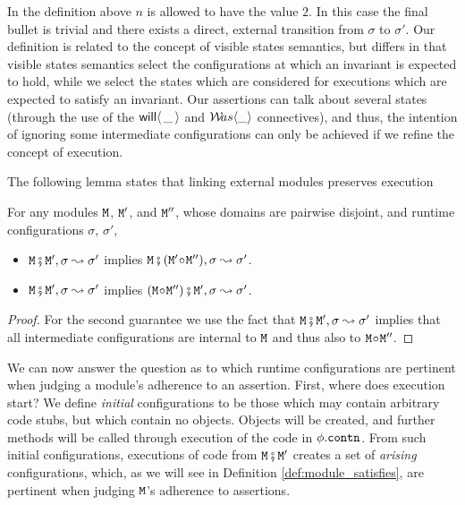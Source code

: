 In the definition above $n$ is allowed to have the value $2$. In this case the final bullet is trivial and  there exists a direct, external transition from $\sigma$ to $\sigma'$.  Our definition is related to the concept of visible states semantics, but differs in that visible states semantics select the configurations at which an invariant is expected to hold, while we select the states which are considered for executions which are expected to satisfy an invariant. Our assertions can talk about several states (through the use of the ${\mathsf{will}}\langle \,\_\,\rangle$ and ${{\mathcal W}\!as}\langle\_\rangle$ connectives), and thus, the intention of ignoring some intermediate configurations can only be achieved if we refine the concept of execution. 

The following lemma states that linking external modules preserves execution

\begin{lemma}
\label{lemma:module_pair_execution}
For any modules ${\mbox{\tt{\ensuremath{{\mbox{\tt{M}}}}}}}$, ${\mbox{\tt{\ensuremath{{\mbox{\tt{M}}}}}}}'$, and ${\mbox{\tt{\ensuremath{{\mbox{\tt{M}}}}}}}''$, whose domains are pairwise disjoint, and runtime configurations $\sigma$, $\sigma'$,

\begin{itemize}
\item
 ${\mbox{\tt{\ensuremath{{\mbox{\tt{M}}}}}}} \fatsemi {\mbox{\tt{\ensuremath{{\mbox{\tt{M}}}}}}}', \sigma \leadsto \sigma'$  implies ${\mbox{\tt{\ensuremath{{\mbox{\tt{M}}}}}}} \fatsemi ({\mbox{\tt{\ensuremath{{\mbox{\tt{M}}}}}}}'\!\circ\!{\mbox{\tt{\ensuremath{{\mbox{\tt{M}}}}}}}'') ,\sigma \leadsto \sigma'$.  
\item
  ${\mbox{\tt{\ensuremath{{\mbox{\tt{M}}}}}}} \fatsemi {\mbox{\tt{\ensuremath{{\mbox{\tt{M}}}}}}}', \sigma \leadsto \sigma'$  implies
$({\mbox{\tt{\ensuremath{{\mbox{\tt{M}}}}}}}\!\circ\!{\mbox{\tt{\ensuremath{{\mbox{\tt{M}}}}}}}'') \fatsemi {\mbox{\tt{\ensuremath{{\mbox{\tt{M}}}}}}}' , \sigma \leadsto \sigma'$.

\end{itemize}
\end{lemma}

\begin{proof} For the second guarantee  we use the fact that   ${\mbox{\tt{\ensuremath{{\mbox{\tt{M}}}}}}} \fatsemi {\mbox{\tt{\ensuremath{{\mbox{\tt{M}}}}}}}', \sigma \leadsto \sigma'$ implies that all
intermediate configurations are internal to ${\mbox{\tt{\ensuremath{{\mbox{\tt{M}}}}}}}$ and thus also to ${\mbox{\tt{\ensuremath{{\mbox{\tt{M}}}}}}}\!\circ\!{\mbox{\tt{\ensuremath{{\mbox{\tt{M}}}}}}}''$.
\end{proof}

We can now answer the question as to which runtime configurations are pertinent when judging a module's
adherence to an assertion.
First, where does execution start? We define {\em initial} configurations to be those which may contain arbitrary code stubs, but which contain no objects. Objects will be created, and further methods will be called through execution of the code in $\phi.{\mbox{\tt{contn}}}$. From such initial configurations, executions of code from ${\mbox{\tt{\ensuremath{{\mbox{\tt{M}}}}}}} \fatsemi {\mbox{\tt{\ensuremath{{\mbox{\tt{M}}}}}}}'$ creates a set of {\em arising} configurations, which, as we will see in Definition \ref{def:module_satisfies}, are pertinent when judging ${\mbox{\tt{\ensuremath{{\mbox{\tt{M}}}}}}}$'s  adherence to assertions.

